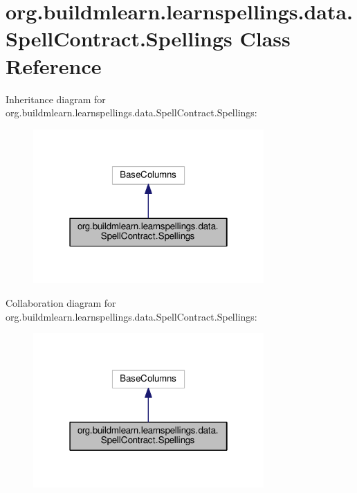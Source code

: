 \hypertarget{classorg_1_1buildmlearn_1_1learnspellings_1_1data_1_1SpellContract_1_1Spellings}{}\section{org.\+buildmlearn.\+learnspellings.\+data.\+Spell\+Contract.\+Spellings Class Reference}
\label{classorg_1_1buildmlearn_1_1learnspellings_1_1data_1_1SpellContract_1_1Spellings}


Inheritance diagram for org.\+buildmlearn.\+learnspellings.\+data.\+Spell\+Contract.\+Spellings\+:
\nopagebreak
\begin{figure}[H]
\begin{center}
\leavevmode
\includegraphics[width=250pt]{classorg_1_1buildmlearn_1_1learnspellings_1_1data_1_1SpellContract_1_1Spellings__inherit__graph}
\end{center}
\end{figure}


Collaboration diagram for org.\+buildmlearn.\+learnspellings.\+data.\+Spell\+Contract.\+Spellings\+:
\nopagebreak
\begin{figure}[H]
\begin{center}
\leavevmode
\includegraphics[width=250pt]{classorg_1_1buildmlearn_1_1learnspellings_1_1data_1_1SpellContract_1_1Spellings__coll__graph}
\end{center}
\end{figure}
